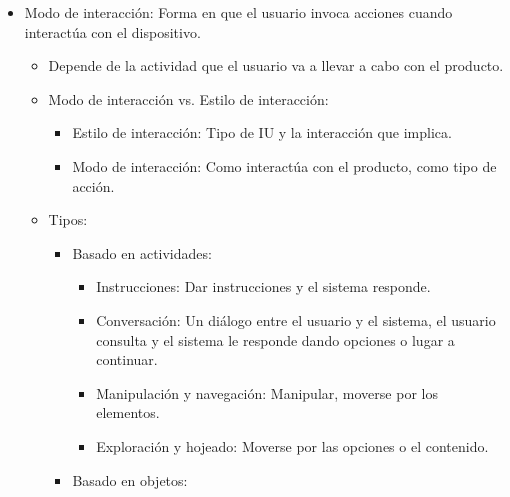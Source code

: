 \documentclass[12pt, twoside, openright]{report} %
\begin{document}
\begin{itemize}
	\item Modo de interacción: Forma en que el usuario invoca acciones
	      cuando interactúa con el dispositivo.

	      \begin{itemize}
		      \item Depende de la actividad que el usuario va a llevar a cabo con
		            el producto.

		      \item Modo de interacción vs. Estilo de interacción:

		            \begin{itemize}
			            \item Estilo de interacción: Tipo de IU y la interacción que
			                  implica.

			            \item Modo de interacción: Como interactúa con el producto, como
			                  tipo de acción.
		            \end{itemize}

		      \item Tipos:

		            \begin{itemize}
			            \item Basado en actividades:

			                  \begin{itemize}
				                  \item Instrucciones: Dar instrucciones y el sistema responde.

				                  \item Conversación: Un diálogo entre el usuario y el sistema, el
				                        usuario consulta y el sistema le responde dando opciones o
				                        lugar a continuar.

				                  \item Manipulación y navegación: Manipular, moverse por los
				                        elementos.

				                  \item Exploración y hojeado: Moverse por las opciones o el
				                        contenido.
			                  \end{itemize}

			            \item Basado en objetos:


\end{itemize}
\end{itemize}
\end{itemize}
\end{document}
